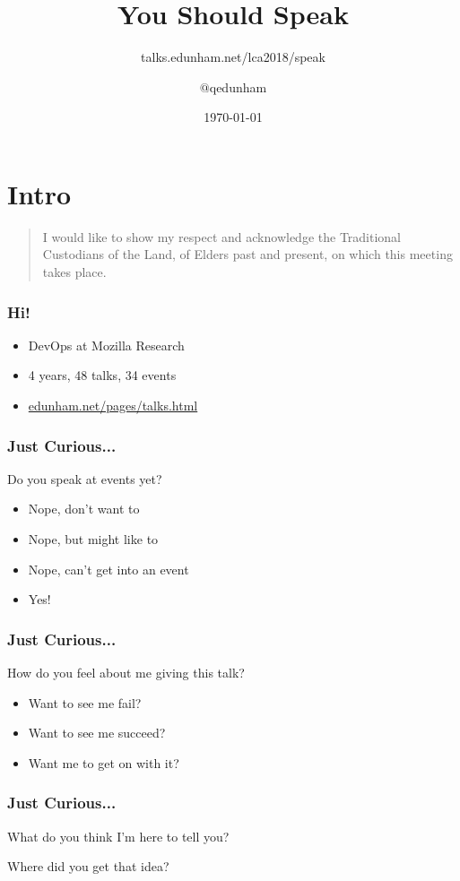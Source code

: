 \documentclass{beamer}
\title{You Should Speak}
\subtitle{talks.edunham.net/lca2018/speak}
\author{$@$qedunham}
\institute{LinuxConf Australia}
\date{\today}
\begin{document}
\begin{frame}[fragile]
\titlepage
\end{frame}

\section{Intro}

\begin{frame}[fragile]
\begin{quote}
I would like to show my respect and acknowledge the Traditional
Custodians of the Land, of Elders past and present, on which this meeting
takes place.
\end{quote}
\end{frame}

\begin{frame}[fragile]
\frametitle{Hi!}
\begin{itemize}[<+(1)->]
\item DevOps at Mozilla Research
\item 4 years, 48 talks, 34 events
\item \url{edunham.net/pages/talks.html}
\end{itemize}
\end{frame}

\begin{frame}[fragile]
\frametitle{Just Curious...}
Do you speak at events yet?
\begin{itemize}[<+(1)->]
\item Nope, don't want to
\item Nope, but might like to
\item Nope, can't get into an event
\item Yes!
\end{itemize}
\end{frame}

\begin{frame}[fragile]
\frametitle{Just Curious...}
How do you feel about me giving this talk?
\begin{itemize}[<+(1)->]
\item Want to see me fail?
\item Want to see me succeed?
\item Want me to get on with it?
\end{itemize}
\end{frame}

\begin{frame}[fragile]
\frametitle{Just Curious...}
What do you think I'm here to tell you?

Where did you get that idea?
\end{frame}
\end{document}
